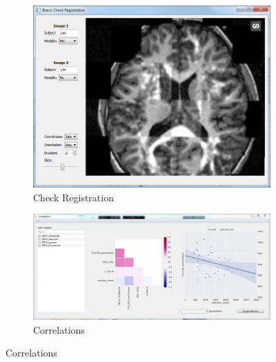 \documentclass{frontiersHLTH}
\begin{document}
\begin{figure}
\begin{center}
\begin{subfigure}[b]{0.48\linewidth}
\includegraphics[width=\textwidth]{check_reg}
\caption{\label{fig_check_reg}Check Registration}
\end{subfigure}\hfill
\begin{subfigure}[b]{0.48\linewidth}
\includegraphics[width=\textwidth]{correlations}
\caption{\label{fig_correlations}Correlations}
\end{subfigure}


\end{center}
\end{figure}
\end{document}
